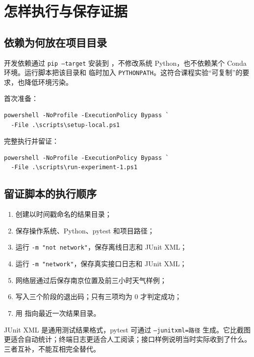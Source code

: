 \documentclass[UTF8,zihao=-4,a4paper]{ctexart}
\newcommand{\code}[1]{\texttt{#1}}
\begin{document}
\section{怎样执行与保存证据}

\subsection{依赖为何放在项目目录}

开发依赖通过 \code{pip --target} 安装到 ，不修改系统 Python，也不依赖某个 Conda 环境。运行脚本把该目录和  临时加入 \code{PYTHONPATH}。这符合课程实验“可复制”的要求，也降低环境污染。

首次准备：

\begin{lstlisting}[style=shellstyle]
powershell -NoProfile -ExecutionPolicy Bypass `
  -File .\scripts\setup-local.ps1
\end{lstlisting}

完整执行并留证：

\begin{lstlisting}[style=shellstyle]
powershell -NoProfile -ExecutionPolicy Bypass `
  -File .\scripts\run-experiment-1.ps1
\end{lstlisting}

\subsection{留证脚本的执行顺序}

\begin{enumerate}
  \item 创建以时间戳命名的结果目录；
  \item 保存操作系统、Python、pytest 和项目路径；
  \item 运行 \code{-m "not network"}，保存离线日志和 JUnit XML；
  \item 运行 \code{-m "network"}，保存真实接口日志和 JUnit XML；
  \item 网络层通过后保存南京位置及前三小时天气样例；
  \item 写入三个阶段的退出码；只有三项均为 0 才判定成功；
  \item 用  指向最近一次结果目录。
\end{enumerate}

JUnit XML 是通用测试结果格式，pytest 可通过 \code{--junitxml=路径} 生成\cite{pytest-junit}。它比截图更适合自动统计；终端日志更适合人工阅读；接口样例说明当时实际收到了什么。三者互补，不能互相完全替代。
\end{document}
